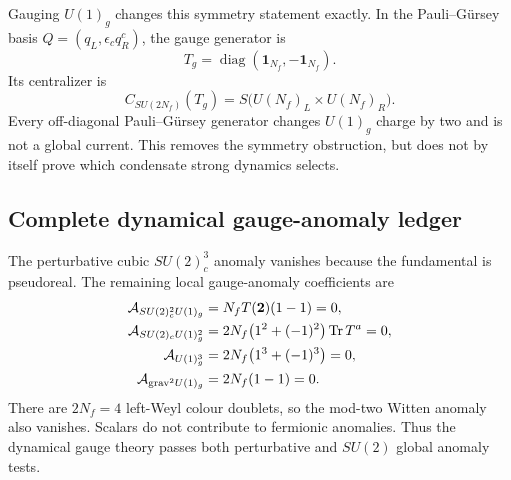 \documentclass[11pt]{article}
\theoremstyle{definition}
\theoremstyle{remark}
\newcommand{\Tr}{\operatorname{Tr}}
\begin{document}
Gauging \(U(1)_g\) changes this symmetry statement exactly.  In the
Pauli--G\"ursey basis
\(Q=(q_L,\epsilon_cq_R^c)\), the gauge generator is
\begin{equation}
 T_g=\operatorname{diag}(\bm1_{N_f},-\bm1_{N_f}).
 \label{eq:pg-generator}
\end{equation}
Its centralizer is
\begin{equation}
 C_{SU(2N_f)}(T_g)=S\bigl(U(N_f)_L\times U(N_f)_R\bigr).
 \label{eq:pg-centralizer}
\end{equation}
Every off-diagonal Pauli--G\"ursey generator changes \(U(1)_g\) charge by
two and is not a global current.  This removes the symmetry obstruction, but
does not by itself prove which condensate strong dynamics selects.

\subsection{Complete dynamical gauge-anomaly ledger}

The perturbative cubic \(SU(2)_c^3\) anomaly vanishes because the fundamental
is pseudoreal.  The remaining local gauge-anomaly coefficients are
\begin{align}
 \mathcal A_{SU(2)_c^2U(1)_g}
 &=N_fT(\bm2)(1-1)=0,\label{eq:su2su2u1}\\
 \mathcal A_{SU(2)_cU(1)_g^2}
 &=2N_f\bigl(1^2+(-1)^2\bigr)\Tr T^a=0,
 \label{eq:su2u1u1}\\
 \mathcal A_{U(1)_g^3}
 &=2N_f\bigl(1^3+(-1)^3\bigr)=0,\label{eq:u1cube}\\
 \mathcal A_{{\rm grav}^2U(1)_g}
 &=2N_f(1-1)=0.\label{eq:gravu1}
\end{align}
There are \(2N_f=4\) left-Weyl colour doublets, so the mod-two Witten anomaly
also vanishes.  Scalars do not contribute to fermionic anomalies.  Thus the
dynamical gauge theory passes both perturbative and \(SU(2)\) global anomaly
tests.
\end{document}
